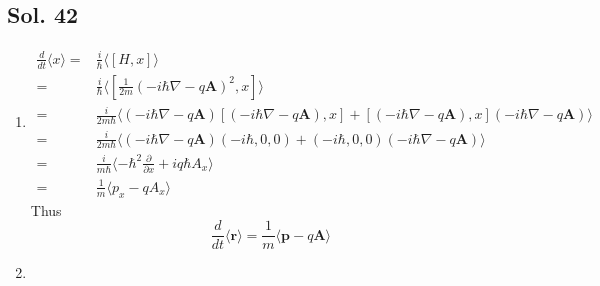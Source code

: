        \subsection*{Sol. 42}
       \begin{enumerate}
           \item 
           \begin{align*}
               \frac{d}{dt}\langle x\rangle
               =&\frac{i}{\hbar}
               \langle[H,x]\rangle\\
               =&\frac{i}{\hbar}
               \langle[\frac{1}{2m}(-i\hbar\nabla-q\bm A)^2,x]\rangle\\
               =&\frac{i}{2m\hbar}
               \langle (-i\hbar\nabla-q\bm A)[(-i\hbar\nabla-q\bm A),x] + [(-i\hbar\nabla-q\bm A),x](-i\hbar\nabla-q\bm A)\rangle\\
               =&\frac{i}{2m\hbar}
               \langle (-i\hbar\nabla-q\bm A)(-i\hbar,0,0)+(-i\hbar,0,0)(-i\hbar\nabla-q\bm A)\rangle\\
               =&\frac{i}{m\hbar}
               \langle-\hbar^2\frac{\partial}{\partial x}+iq\hbar A_x\rangle\\
               =&\frac{1}{m}
               \langle p_x-qA_x\rangle
           \end{align*}
           Thus
           $$
           \frac{d}{dt}\langle \bm{r}\rangle
           =\frac{1}{m}\langle\bm{p}-q\bm{A}\rangle
           $$
           \item 
      


\end{enumerate}
